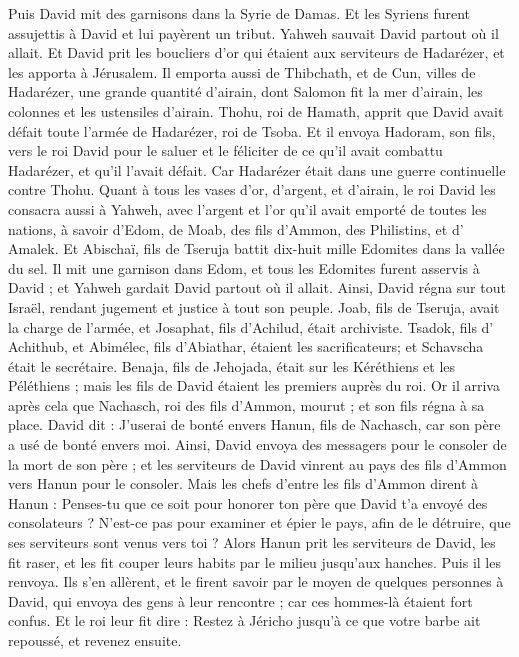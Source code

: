 \begin{multicols}{2}
Puis David mit des garnisons dans la Syrie de Damas. Et les Syriens furent assujettis à David et lui payèrent un tribut. Yahweh sauvait David partout où il allait.
Et David prit les boucliers d'or qui étaient aux serviteurs de Hadarézer, et les apporta à Jérusalem.
Il emporta aussi de Thibchath, et de Cun, villes de Hadarézer, une grande quantité d'airain, dont Salomon fit la mer d'airain, les colonnes et les ustensiles d'airain.
Thohu, roi de Hamath, apprit que David avait défait toute l'armée de Hadarézer, roi de Tsoba.
Et il envoya Hadoram, son fils, vers le roi David pour le saluer et le féliciter de ce qu'il avait combattu Hadarézer, et qu'il l'avait défait. Car Hadarézer était dans une guerre continuelle contre Thohu. Quant à tous les vases d'or, d'argent, et d'airain,
le roi David les consacra aussi à Yahweh, avec l'argent et l'or qu'il avait emporté de toutes les nations, à savoir d'Edom, de Moab, des fils d'Ammon, des Philistins, et d’ Amalek.
Et Abischaï, fils de Tseruja battit dix-huit mille Edomites dans la vallée du sel.
Il mit une garnison dans Edom, et tous les Edomites furent asservis à David ; et Yahweh gardait David partout où il allait.
Ainsi, David régna sur tout Israël, rendant jugement et justice à tout son peuple.
Joab, fils de Tseruja, avait la charge de l'armée, et Josaphat, fils d'Achilud, était archiviste.
Tsadok, fils d' Achithub, et Abimélec, fils d'Abiathar, étaient les sacrificateurs; et Schavscha était le secrétaire.
Benaja, fils de Jehojada, était sur les Kéréthiens et les Péléthiens ; mais les fils de David étaient les premiers auprès du roi.
\VerseOne{}Or il arriva après cela que Nachasch, roi des fils d’Ammon, mourut ; et son fils régna à sa place.
David dit : J'userai de bonté envers Hanun, fils de Nachasch, car son père a usé de bonté envers moi. Ainsi, David envoya des messagers pour le consoler de la mort de son père ; et les serviteurs de David vinrent au pays des fils d’Ammon vers Hanun pour le consoler.
Mais les chefs d'entre les fils d’Ammon dirent à Hanun : Penses-tu que ce soit pour honorer ton père que David t'a envoyé des consolateurs ? N'est-ce pas pour examiner et épier le pays, afin de le détruire, que ses serviteurs sont venus vers toi ?
Alors Hanun prit les serviteurs de David, les fit raser, et les fit couper leurs habits par le milieu jusqu'aux hanches. Puis il les renvoya.
Ils s'en allèrent, et le firent savoir par le moyen de quelques personnes à David, qui envoya des gens à leur rencontre ; car ces hommes-là étaient fort confus. Et le roi leur fit dire : Restez à Jéricho jusqu'à ce que votre barbe ait repoussé, et revenez ensuite.

\end{multicols}

